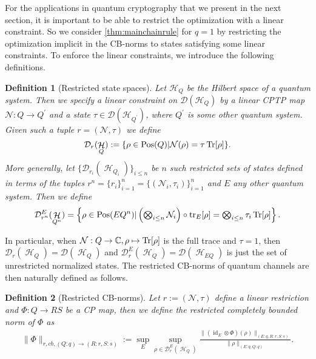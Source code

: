 \documentclass[11pt]{article}
\DeclareMathOperator{\Pos}{Pos}
\DeclareMathOperator{\id}{id}
\newcommand{\1}{\ensuremath{\mathbbm{1}}}
\theoremstyle{newdefinition}
\newtheorem{definition}{Definition}[section]
\theoremstyle{newplain}
\theoremstyle{myplain}
\DeclareMathOperator{\cH}{\mathcal{H}}
\begin{document}
For the applications in quantum cryptography that we present in the next section, it is important to be able to restrict the optimization with a linear constraint. So we consider \cref{thm:mainchainrule} for $q = 1$ by restricting the optimization implicit in the CB-norms to states satisfying some linear constraints. To enforce the linear constraints, we introduce the following definitions.

\begin{definition}[Restricted state spaces]
    Let $\mathcal{H}_Q$ be the Hilbert space of a quantum system. Then we specify a linear constraint on $\mathcal{D}(\mathcal{H}_Q)$ by a linear CPTP map $\mathcal{N}:Q\to Q^\prime$ and a state $\tau\in\mathcal{D}(\mathcal{H}_{Q^\prime})$, where $Q^\prime$ is some other quantum system. 
Given such a tuple $r=(\mathcal{N},\tau)$ we define
\begin{equation}\label{def:reduced.state.spaces}
    \mathcal{D}_r(\cH_Q) := \{\rho \in \Pos(Q)|\mathcal N(\rho) = \tau\Tr[\rho]\}.
    \end{equation}    
More generally, let $\{\mathcal{D}_{r_i}(\cH_{Q_i})\}_{i\leq n}$ be $n$ such restricted sets of states defined in terms of the tuples $r^n=\{r_i\}_{i=1}^n=\{(\mathcal N_i,\tau_i)\}^n_{i=1}$ and $E$ any other quantum system. Then we define
\begin{equation}\label{eq:reduced.state.spaces.with.Environement}
    \mathcal{D}^E_{r^n}(\cH_{Q^n})= \left\{ \rho\in \Pos(EQ^n)|\textstyle\left(\bigotimes_{i\leq n}\mathcal N_i\right) \circ \tr_E[\rho] = \textstyle\bigotimes_{i\leq n}\tau_i\Tr[\rho]\right\}.
\end{equation}
\end{definition}
In particular, when $\mathcal{N}:Q\to \mathbb{C}, \rho\mapsto\Tr[\rho]$ is the full trace and $\tau = 1$, then $\mathcal{D}_r(\cH_Q) = \mathcal{D}(\cH_Q)$ and $\mathcal{D}^E_r(\cH_Q) = \mathcal{D}(\cH_{EQ})$ is just the set of unrestricted normalized states. The restricted CB-norms of quantum channels are then naturally defined as follows.
\begin{definition}[Restricted CB-norms]
Let $r:=(\mathcal{N},\tau)$ define a linear restriction and $\Phi:Q\to RS$ be a CP map, then we define the \textit{restricted completely bounded norm} of $\Phi$ as
\begin{align}
\|\Phi\|_{r,cb,(Q:q)\to(R:r,S:s)}:=\sup_E\sup_{\rho\in \mathcal{D}_r^E(\cH_Q)}\frac{\|(\id_E\otimes\Phi)(\rho)\|_{(E:q,R:r,S:s)}}{\|\rho\|_{(E:q,Q:q)}}.
\end{align}
\end{definition}
\end{document}
